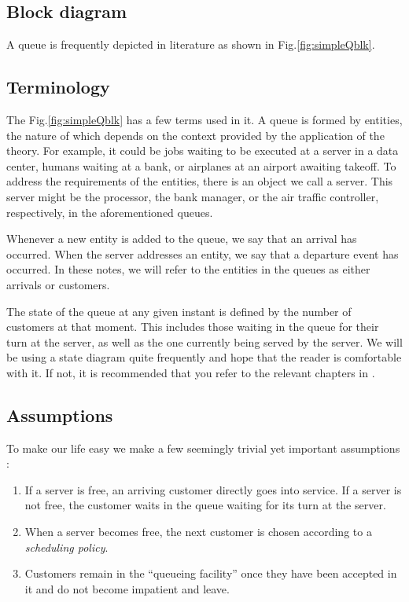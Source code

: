 \documentclass[11pt, a4paper]{report}
\begin{document}
\subsection{Block diagram}
A queue is frequently depicted in literature as shown in Fig.\ref{fig:simpleQblk}.

\subsection{Terminology}
The Fig.\ref{fig:simpleQblk} has a few terms used in it.  A queue is formed by entities, the nature of which depends on the context provided by the application of the theory. For example, it could be jobs waiting to be executed at a server in a data center, humans waiting at a bank, or airplanes at an airport awaiting takeoff. To address the requirements of the entities, there is an object we call a server. This server might be the processor, the bank manager, or the air traffic controller, respectively, in the aforementioned queues.

Whenever a new entity is added to the queue, we say that an arrival has occurred. When the server addresses an entity, we say that a departure event has occurred. In these notes, we will refer to the entities in the queues as either arrivals or customers.

The state of the queue at any given instant is defined by the number of customers at that moment. This includes those waiting in the queue for their turn at the server, as well as the one currently being served by the server. We will be using a state diagram quite frequently and hope that the reader is comfortable with it. If not, it is recommended that you refer to the relevant chapters in \cite{pishro2014introduction}.

\subsection{Assumptions}
To make our life easy we make a few seemingly trivial yet important assumptions \cite{myReference}:
\begin{enumerate}
    \item If a server is free, an arriving customer directly goes into service. If a server is not free, the customer waits in the queue waiting for its turn at the server. 
    \item When a server becomes free, the next customer is chosen according to a \emph{scheduling policy}.
    \item Customers remain in the ``queueing facility'' once they have been accepted in it and do not become impatient and leave.
\end{enumerate}
\end{document}
